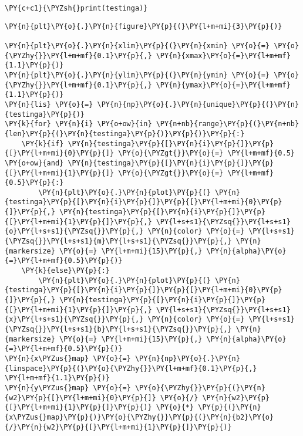     \begin{tcolorbox}[breakable, size=fbox, boxrule=1pt, pad at break*=1mm,colback=cellbackground, colframe=cellborder]
\begin{Verbatim}[commandchars=\\\{\}]
\PY{c+c1}{\PYZsh{}print(testinga)}
\end{Verbatim}
\end{tcolorbox}

    \begin{tcolorbox}[breakable, size=fbox, boxrule=1pt, pad at break*=1mm,colback=cellbackground, colframe=cellborder]
\begin{Verbatim}[commandchars=\\\{\}]
\PY{n}{plt}\PY{o}{.}\PY{n}{figure}\PY{p}{(}\PY{l+m+mi}{3}\PY{p}{)}

\PY{n}{plt}\PY{o}{.}\PY{n}{xlim}\PY{p}{(}\PY{n}{xmin} \PY{o}{=} \PY{o}{\PYZhy{}}\PY{l+m+mf}{0.1}\PY{p}{,} \PY{n}{xmax}\PY{o}{=}\PY{l+m+mf}{1.1}\PY{p}{)}
\PY{n}{plt}\PY{o}{.}\PY{n}{ylim}\PY{p}{(}\PY{n}{ymin} \PY{o}{=} \PY{o}{\PYZhy{}}\PY{l+m+mf}{0.1}\PY{p}{,} \PY{n}{ymax}\PY{o}{=}\PY{l+m+mf}{1.1}\PY{p}{)}
\PY{n}{lis} \PY{o}{=} \PY{n}{np}\PY{o}{.}\PY{n}{unique}\PY{p}{(}\PY{n}{testinga}\PY{p}{)}
\PY{k}{for} \PY{n}{i} \PY{o+ow}{in} \PY{n+nb}{range}\PY{p}{(}\PY{n+nb}{len}\PY{p}{(}\PY{n}{testinga}\PY{p}{)}\PY{p}{)}\PY{p}{:}
    \PY{k}{if} \PY{n}{testinga}\PY{p}{[}\PY{n}{i}\PY{p}{]}\PY{p}{[}\PY{l+m+mi}{0}\PY{p}{]} \PY{o}{\PYZgt{}}\PY{o}{=} \PY{l+m+mf}{0.5} \PY{o+ow}{and} \PY{n}{testinga}\PY{p}{[}\PY{n}{i}\PY{p}{]}\PY{p}{[}\PY{l+m+mi}{1}\PY{p}{]} \PY{o}{\PYZgt{}}\PY{o}{=} \PY{l+m+mf}{0.5}\PY{p}{:}
        \PY{n}{plt}\PY{o}{.}\PY{n}{plot}\PY{p}{(} \PY{n}{testinga}\PY{p}{[}\PY{n}{i}\PY{p}{]}\PY{p}{[}\PY{l+m+mi}{0}\PY{p}{]}\PY{p}{,} \PY{n}{testinga}\PY{p}{[}\PY{n}{i}\PY{p}{]}\PY{p}{[}\PY{l+m+mi}{1}\PY{p}{]}\PY{p}{,} \PY{l+s+s1}{\PYZsq{}}\PY{l+s+s1}{o}\PY{l+s+s1}{\PYZsq{}}\PY{p}{,} \PY{n}{color} \PY{o}{=} \PY{l+s+s1}{\PYZsq{}}\PY{l+s+s1}{m}\PY{l+s+s1}{\PYZsq{}}\PY{p}{,} \PY{n}{markersize} \PY{o}{=} \PY{l+m+mi}{15}\PY{p}{,} \PY{n}{alpha}\PY{o}{=}\PY{l+m+mf}{0.5}\PY{p}{)}
    \PY{k}{else}\PY{p}{:}
        \PY{n}{plt}\PY{o}{.}\PY{n}{plot}\PY{p}{(} \PY{n}{testinga}\PY{p}{[}\PY{n}{i}\PY{p}{]}\PY{p}{[}\PY{l+m+mi}{0}\PY{p}{]}\PY{p}{,} \PY{n}{testinga}\PY{p}{[}\PY{n}{i}\PY{p}{]}\PY{p}{[}\PY{l+m+mi}{1}\PY{p}{]}\PY{p}{,} \PY{l+s+s1}{\PYZsq{}}\PY{l+s+s1}{x}\PY{l+s+s1}{\PYZsq{}}\PY{p}{,} \PY{n}{color} \PY{o}{=} \PY{l+s+s1}{\PYZsq{}}\PY{l+s+s1}{b}\PY{l+s+s1}{\PYZsq{}}\PY{p}{,} \PY{n}{markersize} \PY{o}{=} \PY{l+m+mi}{15}\PY{p}{,} \PY{n}{alpha}\PY{o}{=}\PY{l+m+mf}{0.5}\PY{p}{)}
\PY{n}{x\PYZus{}map} \PY{o}{=} \PY{n}{np}\PY{o}{.}\PY{n}{linspace}\PY{p}{(}\PY{o}{\PYZhy{}}\PY{l+m+mf}{0.1}\PY{p}{,} \PY{l+m+mf}{1.1}\PY{p}{)}
\PY{n}{y\PYZus{}map} \PY{o}{=} \PY{o}{\PYZhy{}}\PY{p}{(}\PY{n}{w2}\PY{p}{[}\PY{l+m+mi}{0}\PY{p}{]} \PY{o}{/} \PY{n}{w2}\PY{p}{[}\PY{l+m+mi}{1}\PY{p}{]}\PY{p}{)} \PY{o}{*} \PY{p}{(}\PY{n}{x\PYZus{}map}\PY{p}{)}\PY{o}{\PYZhy{}}\PY{p}{(}\PY{n}{b2}\PY{o}{/}\PY{n}{w2}\PY{p}{[}\PY{l+m+mi}{1}\PY{p}{]}\PY{p}{)}


\end{Verbatim}
\end{tcolorbox}
